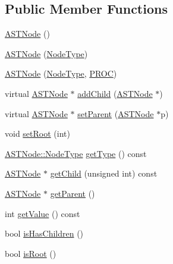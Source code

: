 \subsection*{Public Member Functions}
\begin{DoxyCompactItemize}
\item 
\hyperlink{class_a_s_t_node_a1196ed4f19c0b62cdc42fe35946b91d2}{A\-S\-T\-Node} ()
\item 
\hyperlink{class_a_s_t_node_a512c4363de4ceef82b6189e1dbd34ec1}{A\-S\-T\-Node} (\hyperlink{class_a_s_t_node_a4fd016b5f0e44ea6aca3542d27de3859}{Node\-Type})
\item 
\hyperlink{class_a_s_t_node_a97d3345ffb311a0582a8bf1478722a70}{A\-S\-T\-Node} (\hyperlink{class_a_s_t_node_a4fd016b5f0e44ea6aca3542d27de3859}{Node\-Type}, \hyperlink{std_afx_8h_aa07ea1d188c7b45668f1bd82ffd6d87e}{P\-R\-O\-C})
\item 
virtual \hyperlink{class_a_s_t_node}{A\-S\-T\-Node} $\ast$ \hyperlink{class_a_s_t_node_a595fb15c3e37a7a9e443742dca6483ca}{add\-Child} (\hyperlink{class_a_s_t_node}{A\-S\-T\-Node} $\ast$)
\item 
virtual \hyperlink{class_a_s_t_node}{A\-S\-T\-Node} $\ast$ \hyperlink{class_a_s_t_node_a70e8aa10baa353684ae8288f3460a5fc}{set\-Parent} (\hyperlink{class_a_s_t_node}{A\-S\-T\-Node} $\ast$p)
\item 
void \hyperlink{class_a_s_t_node_a940adeca834d8d00d6d9fa70be68bc0f}{set\-Root} (int)
\item 
\hyperlink{class_a_s_t_node_a4fd016b5f0e44ea6aca3542d27de3859}{A\-S\-T\-Node\-::\-Node\-Type} \hyperlink{class_a_s_t_node_afa85380e2e00c7b3166d61ae696b8365}{get\-Type} () const 
\item 
\hyperlink{class_a_s_t_node}{A\-S\-T\-Node} $\ast$ \hyperlink{class_a_s_t_node_a68ef18e60e551c9ba047e3d1809d8620}{get\-Child} (unsigned int) const 
\item 
\hyperlink{class_a_s_t_node}{A\-S\-T\-Node} $\ast$ \hyperlink{class_a_s_t_node_a62e103d706cfbace82cf124bbd080c3e}{get\-Parent} ()
\item 
int \hyperlink{class_a_s_t_node_a899c8bb0314158fc8ca7d5688b89e165}{get\-Value} () const 
\item 
bool \hyperlink{class_a_s_t_node_ae26a0a4a3beebf3ef460ff603cbc3a97}{is\-Has\-Children} ()
\item 
bool \hyperlink{class_a_s_t_node_aba44d4dd6234cab7a2c3f153b65bd97f}{is\-Root} ()
\end{DoxyCompactItemize}
